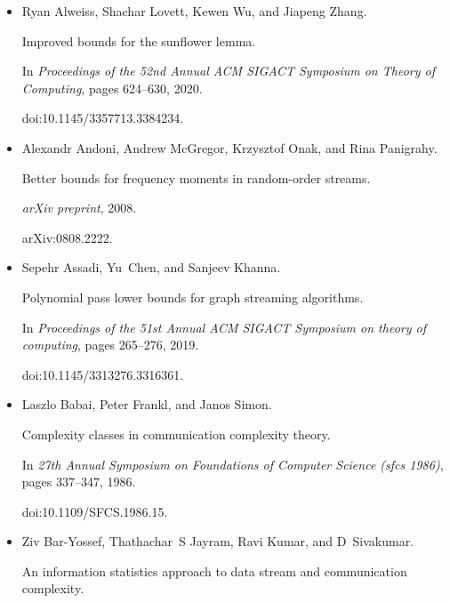 \documentclass[10pt,a4paper]{article}
\begin{document}
\begin{itemize}


\item[] 
[1]

Ryan Alweiss, Shachar Lovett, Kewen Wu, and Jiapeng Zhang.


Improved bounds for the sunflower lemma.


In \emph{Proceedings of the 52nd Annual ACM SIGACT Symposium on Theory
of Computing}, pages 624–630, 2020.


doi:10.1145/3357713.3384234.





\item[] 
[2]

Alexandr Andoni, Andrew McGregor, Krzysztof Onak, and Rina Panigrahy.


Better bounds for frequency moments in random-order streams.


\emph{arXiv preprint}, 2008.


arXiv:0808.2222.





\item[] 
[3]

Sepehr Assadi, Yu Chen, and Sanjeev Khanna.


Polynomial pass lower bounds for graph streaming algorithms.


In \emph{Proceedings of the 51st Annual ACM SIGACT Symposium on theory
of computing}, pages 265–276, 2019.


doi:10.1145/3313276.3316361.





\item[] 
[4]

Laszlo Babai, Peter Frankl, and Janos Simon.


Complexity classes in communication complexity theory.


In \emph{27th Annual Symposium on Foundations of Computer Science
(sfcs 1986)}, pages 337–347, 1986.


doi:10.1109/SFCS.1986.15.





\item[] 
[5]

Ziv Bar-Yossef, Thathachar S Jayram, Ravi Kumar, and D Sivakumar.


An information statistics approach to data stream and communication
complexity.



\end{itemize}
\end{document}
